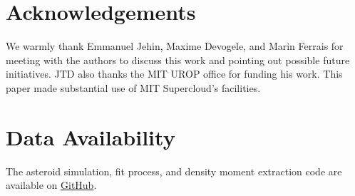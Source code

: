 \documentclass[fleqn,usenatbib]{mnras}
\begin{document}
\section*{Acknowledgements}

We warmly thank Emmanuel Jehin, Maxime Devogele, and Marin Ferrais for meeting with the authors to discuss this work and pointing out possible future initiatives. JTD also thanks the MIT UROP office for funding his work. This paper made substantial use of MIT Supercloud's facilities.



\section*{Data Availability}

The asteroid simulation, fit process, and density moment extraction code are available on \href{https://github.com/jack-dinsmore/asteroid-tidal-torque}{GitHub}.












\bsp	%
\label{lastpage}
\end{document}
